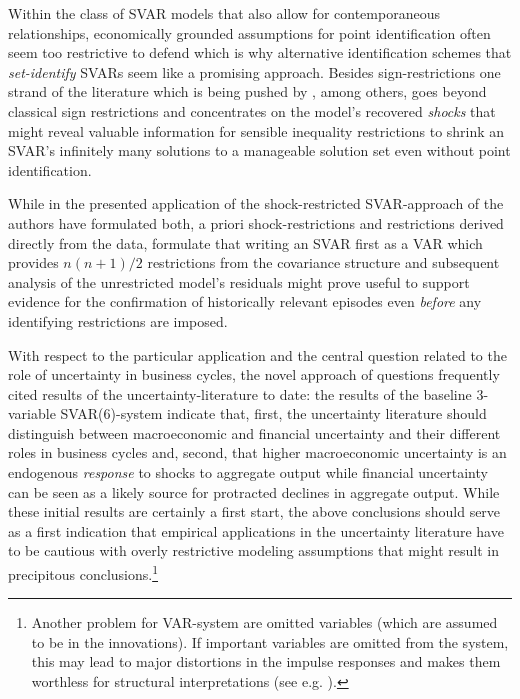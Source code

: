 \documentclass[a4paper,11pt,listof=nochaptergap,oneside,pointednumbers,bibtotoc,bigheadings,liststotoc,hidelinks]{scrbook}
\theoremstyle{mysatz}
\theoremstyle{mydefinition}
\theoremstyle{mytheorem}
\theoremstyle{mybemerkung}
\begin{document}
Within the class of SVAR models that also allow for contemporaneous relationships, economically grounded assumptions for point identification often seem too restrictive to defend which is why alternative identification schemes that \textit{set-identify} \citep{granzieraetal:18} SVARs seem like a promising approach. Besides sign-restrictions one strand of the literature which is being pushed by \citet{ludvigsonetal:20a}, among others, goes beyond classical sign restrictions and concentrates on the model's recovered \textit{shocks} that might reveal valuable information for sensible inequality restrictions to shrink an SVAR's infinitely many solutions to a manageable solution set even without point identification. 

While in the presented application of the shock-restricted SVAR-approach of \citet{ludvigsonetal:19} the authors have formulated both, a priori shock-restrictions and restrictions derived directly from the data, \citet{ludvigsonetal:20a} formulate that writing an SVAR first as a VAR which provides $n(n+1)/2$ restrictions from the covariance structure and subsequent analysis of the unrestricted model's residuals might prove useful to support evidence for the confirmation of historically relevant episodes even \textit{before} any identifying restrictions are imposed.

With respect to the particular application and the central question related to the role of uncertainty in business cycles, the novel approach of \citet{ludvigsonetal:18, ludvigsonetal:19} questions frequently cited results of the uncertainty-literature to date: the results of the baseline 3-variable SVAR(6)-system indicate that, first, the uncertainty literature should distinguish between macroeconomic and financial uncertainty and their different roles in business cycles and, second, that higher macroeconomic uncertainty is an endogenous \textit{response} to shocks to aggregate output while financial uncertainty can be seen as a likely source for protracted declines in aggregate output. While these initial results are certainly a first start, the above conclusions should serve as a first indication that empirical applications in the uncertainty literature have to be cautious with overly restrictive modeling assumptions that might result in precipitous conclusions.\footnote{Another problem for VAR-system are omitted variables (which are assumed to be in the innovations). If important variables are omitted from the system, this may lead to major distortions in the impulse responses and makes them worthless for structural interpretations (see e.g. \citealp{lutkepohl:05}).} \\
\end{document}
